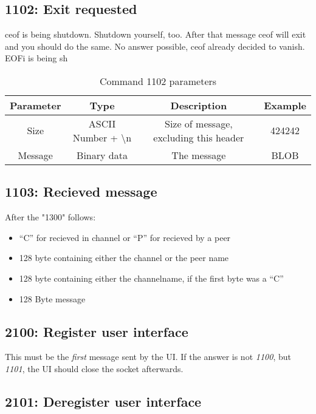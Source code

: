 \documentclass[12pt,a4paper]{book}
\begin{document}
\subsection{1102: Exit requested}
ceof is being shutdown.
Shutdown yourself, too.
After that message ceof will exit and you should do the same.
No answer possible, ceof already decided to vanish.
EOFi is being sh
\begin{longtable}{|c|c|c|c|}
\caption{Command 1102 parameters}\\
\hline
\textbf{Parameter} & \textbf{Type} & \textbf{Description} & \textbf{Example}\\
\hline
Size & ASCII Number + \textbackslash{}n & Size of message, excluding this header & 424242\\
\hline
Message & Binary data & The message & BLOB\\
\hline
\end{longtable}
\subsection{1103: Recieved message}
After the "1300" follows:
\begin{itemize}
\item "`C"' for recieved in channel or "`P"' for recieved by a peer
\item 128 byte containing either the channel or the peer name
\item 128 byte containing either the channelname, if the first byte was a "`C"'
\item 128 Byte message
\end{itemize}
\subsection{2100: Register user interface}
This must be the \emph{first} message sent by the UI. If the answer is not
\emph{1100}, but \emph{1101}, the UI should close the socket afterwards.
\subsection{2101: Deregister user interface}
\end{document}
